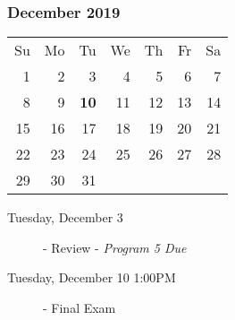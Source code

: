\subsubsection*{December 2019}
\begin{tabular}{rrrrrrr}
Su & Mo & Tu & We & Th & Fr & Sa\\
 1 &  2 &  3 &  4 &  5 &  6 &  7\\
 8 &  9 & {\bf 10} & 11 & 12 & 13 & 14\\
15 & 16 & 17 & 18 & 19 & 20 & 21\\
22 & 23 & 24 & 25 & 26 & 27 & 28\\
29 & 30 & 31 &    &    &    &   \\
\end{tabular}
\begin{description}
\item[Tuesday, December 3]
  - Review
  \newline- {\em Program 5 Due}
\item[Tuesday, December 10 1:00PM] 
  - Final Exam
\end{description}
